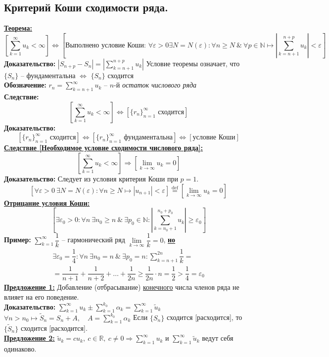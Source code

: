 \documentclass[a4paper,12pt]{article} %
\newcommand{\eqdef}{\stackrel{\mathrm{def}}{=}}
\newcommand{\R}{\mathbb{R}}
\newcommand{\N}{\mathbb{N}}
\newcommand{\useries}{\sum\limits_{k=1}^{\infty} u_k}
\newcommand{\useriesl}{\sum\limits_{k=1}^{\infty} u_k < \infty}
\begin{document}
\subsection{Критерий Коши сходимости ряда.}
\underline{\textbf{Теорема:}}
\[ \left[\useriesl \right] \Leftrightarrow \left[\text{Выполнено условие Коши: } \forall \varepsilon > 0  \exists N = N(\varepsilon): \forall n \geqslant N \ \& \ \forall p \in \N \mapsto \left|\sum\limits_{k=n+1}^{n+p} u_k \right| < \varepsilon \right] \]
\textbf{Доказательство:}
$|S_{n+p} - S_n| = \left|\sum\limits_{k=n+1}^{n+p} u_k \right|$
Условие теоремы означает, что $\{ S_n \}$ -- фундаментальна $\Leftrightarrow$ $\{ S_n \}$ сходится\\
\textbf{Обозначение:}
$r_n = \sum\limits_{k=n+1}^{\infty} u_k$ -- $n$-й \textit{остаток числового ряда}\\
\textbf{Следствие:}
\[ \left[ \useriesl \right] \Leftrightarrow \left[ \{ r_n \}_{n=1}^{\infty} \text{ сходится} \right] \]
\textbf{Доказательство:}
\[ \left[ \{ r_n \}_{n=1}^{\infty} \text{ сходится} \right] \Leftrightarrow \left[ \{ r_n \}_{n=1}^{\infty} \text{ фундаментальна} \right] \Leftrightarrow \left[ \text{условие Коши} \right] \]
\underline{\textbf{Следствие [Необходимое условие сходимости числового ряда]:}}
\[ \left[ \useriesl \right] \Rightarrow \left[ \lim\limits_{k \to \infty} u_k = 0 \right] \]
\textbf{Доказательство:}
Следует из условия критерия Коши при $p = 1$.
\[ \left[ \forall \varepsilon > 0 \ \exists N = N(\varepsilon): \forall n \geqslant N \mapsto |u_{n+1}|<\varepsilon \right] \eqdef \left[ \lim\limits_{k \to \infty}  u_k = 0 \right] \]
\underline{\textbf{Отрицание условия Коши:}}
\[ \left[ \exists \varepsilon_0 > 0: \forall n \ \exists n_0 \geqslant n \ \& \ \exists p_0 \in \N: \left| \sum\limits_{k = n_0 + 1}^{n_0 + p_0} u_k \right| \geqslant \varepsilon_0 \right] \]
\textbf{Пример:}
$\sum\limits_{k=1}^{\infty} \dfrac{1}{k}$ -- гармонический ряд
$\lim\limits_{k \to \infty} \dfrac{1}{k} = 0$, \underline{\textbf{но}}
\begin{multline*}
	\exists \varepsilon_0 = \dfrac{1}{4}: \forall n \ \exists n_0 = n \ \& \ \exists p_0 = n: \sum\limits_{k = n+1}^{2n} \dfrac{1}{k} = \\ = \dfrac{1}{n+1}+ \dfrac{1}{n+2} + \ldots + \dfrac{1}{2n} \geqslant \dfrac{1}{2n} \cdot n = \dfrac{1}{2} > \dfrac{1}{4} = \varepsilon_0
\end{multline*}
\underline{\textbf{Предложение 1:}} Добавление (отбрасывание) \underline{конечного} числа членов ряда не влияет на его поведение.\\
\textbf{Доказательство:}
$\useries \pm \sum\limits_{k=1}^{k_0} \alpha_k = \sum\limits_{k=1}^{\infty} \tilde{u}_k$
$\forall n > n_0 \mapsto \tilde{S}_n = S_n + A, \hspace{1em} A = \sum\limits_{k=1}^{k_0} \alpha_k$
Если $\{ S_n \}$ сходится [расходится], то $\{ \tilde{S}_n \}$ сходится [расходится].\\
\underline{\textbf{Предложение 2:}}
$\tilde{u}_k = cu_k, ~c \in \R, ~c \neq 0 \Rightarrow \useries \text{ и } \sum\limits_{k=1}^{\infty} \tilde{u}_k$ ведут себя одинаково.
\end{document}
